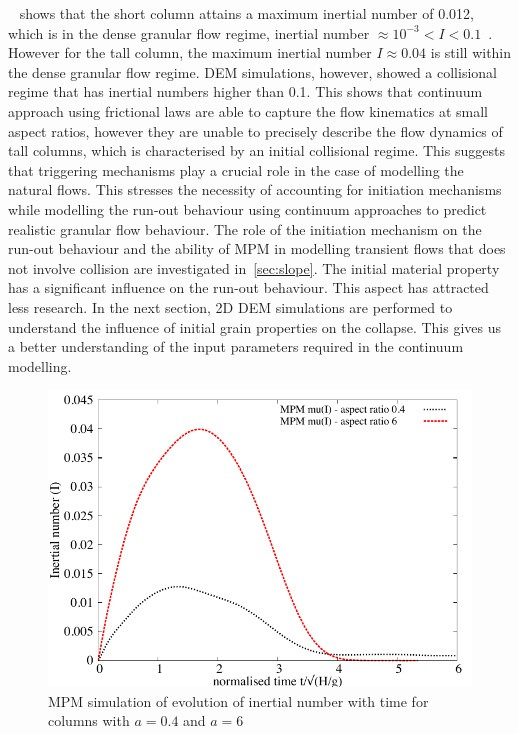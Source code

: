 ~ shows that the short column attains a maximum inertial 
number of 0.012, which is in the dense granular flow regime, inertial number 
$\approx10^{-3} < I < 0.1$~\citep{DaCruz2005}. However for the tall 
column, the maximum inertial number $I\approx0.04$ is still within the 
dense granular flow regime. DEM simulations, however, showed a collisional 
regime that has inertial numbers higher than 0.1. This shows that continuum 
approach using frictional laws are able to capture the flow kinematics at small 
aspect ratios, however they are unable to precisely describe the flow dynamics 
of tall columns, which is characterised by an initial collisional regime. This 
suggests that triggering mechanisms play a crucial role in the case of 
modelling the natural flows. This stresses the necessity of accounting for 
initiation mechanisms while modelling the run-out behaviour 
using continuum approaches to predict realistic granular flow behaviour. The 
role of the initiation mechanism on the run-out behaviour and the ability of 
MPM in modelling transient flows that does not involve collision are 
investigated in~\cref{sec:slope}. The initial material property has a 
significant influence on the run-out behaviour. This aspect has attracted less 
research. In the next section, 2D DEM simulations are performed to understand 
the influence of initial grain properties on the collapse. This gives us a 
better understanding of the input parameters required in the continuum 
modelling. 

\begin{figure}[tbhp]
\centering
\includegraphics[width=\textwidth]{muI}
\caption{MPM simulation of evolution of inertial number with time for columns 
with $a=0.4$ and 
$a=6$}
\label{fig:muI}
\end{figure}

